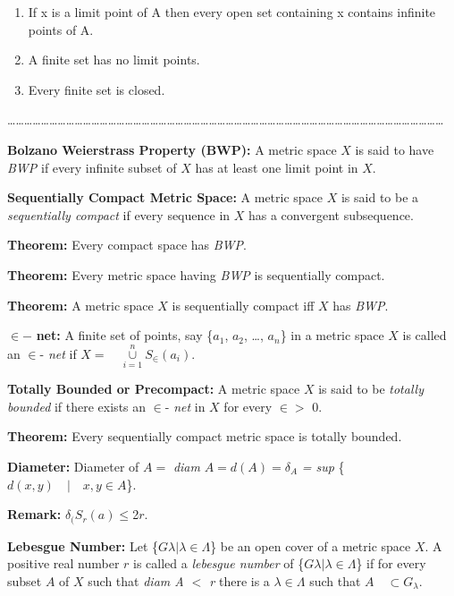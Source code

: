 \documentclass[12pt]{amsart}
\begin{document}
\begin{enumerate}
\item If x is a limit point of A then every open set containing x contains infinite points of A.
\item A finite set has no limit points.
\item Every finite set is closed.
\end{enumerate}
{\ldots}{\ldots}{\ldots}{\ldots}{\ldots}{\ldots}{\ldots}{\ldots}{\ldots}{\ldots}{\ldots}{\ldots}{\ldots}{\ldots}{\ldots}{\ldots}{\ldots}{\ldots}{\ldots}{\ldots}{\ldots}{\ldots}{\ldots}{\ldots}{\ldots}{\ldots}{\ldots}{\ldots}{\ldots}{\ldots}{\ldots}{\ldots}{\ldots}{\ldots}{\ldots}{\ldots}{\ldots}{\ldots}{\ldots}{\ldots}{\ldots}{\ldots}{\ldots}{\ldots}{\ldots}{\ldots}{\ldots}{\ldots}{\ldots}{\ldots}{\ldots}{\ldots}

\textbf{Bolzano Weierstrass Property (BWP):} A metric space $X$ is said to have 
\textit{BWP} if every infinite subset of $X$ has at least one limit point in $X$.

\textbf{Sequentially Compact Metric Space:} A metric space $X$ is said to be a 
\textit{sequentially compact} if every sequence in $X$ has a convergent subsequence.

\textbf{Theorem:} Every compact space has \textit{BWP}.

\textbf{Theorem:} Every metric space having \textit{BWP} is sequentially compact.

\textbf{Theorem: }A metric space $X$ is sequentially compact iff $X$ has \textit{BWP}.

$\in -$ \textbf{net:} A finite set of points, say {\{}$a_{1}$, $a_{2}$, 
{\ldots}, $a_{n}${\}} in a metric space $X$ is called an $\in $- \textit{net} if $X = \quad \mathop 
\cup \limits_{i=1}^n S_\in (a_i )$.

\textbf{Totally Bounded or Precompact:} A metric space $X$ is said to be 
\textit{totally bounded} if there exists an $\in $- \textit{net} in $X$ for every $\in >$ 0.

\textbf{Theorem:} Every sequentially compact metric space is totally 
bounded.

\textbf{Diameter: }Diameter of $A =$ \textit{diam} $A = d (A)=\delta _A $ \textit{= sup} {\{}$d (x, y) \quad \vert  \quad x, y\in 
A${\}}.

\textbf{Remark:} $\delta _ (S_{r}(a)\leqslant $2$r$.

\textbf{Lebesgue Number:} Let {\{}$G\lambda \vert \lambda \in \Lambda 
${\}} be an open cover of a metric space $X$. A positive real number $r$ is called 
a \textit{lebesgue number} of {\{}$G\lambda \vert \lambda \in \Lambda ${\}} if for every subset 
$A$ of $X$ such that \textit{diam A $<$ r} there is a $\lambda \in \Lambda $ such that $A \quad \subset 
G_\lambda $.
\end{document}
